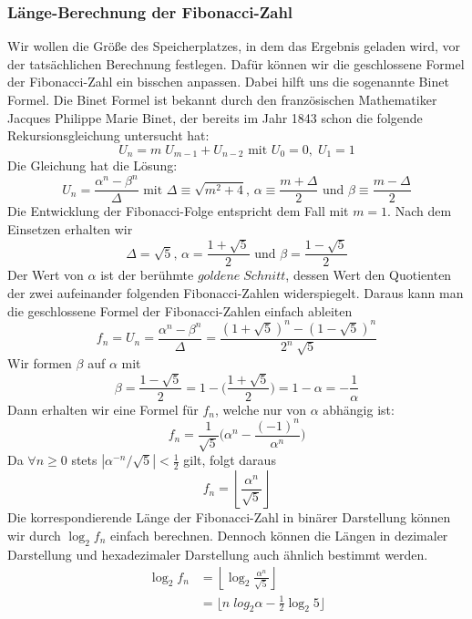 \documentclass[course=erap]{aspdoc}
\begin{document}
\subsubsection{Länge-Berechnung der Fibonacci-Zahl}
Wir wollen die Größe des Speicherplatzes, in dem das Ergebnis geladen wird, vor der tatsächlichen Berechnung festlegen. Dafür können wir die geschlossene Formel der Fibonacci-Zahl ein bisschen anpassen. Dabei hilft uns die sogenannte Binet Formel. Die Binet Formel ist bekannt durch den französischen Mathematiker Jacques Philippe Marie Binet\cite{binet}, der bereits im Jahr 1843 schon die folgende Rekursionsgleichung untersucht hat:
\begin{equation*}
    U_n = m \; U_{m-1}+U_{n-2} 
    \text{ mit } 
    U_0=0, \; U_1=1
\end{equation*}
Die Gleichung hat die Lösung:
\begin{equation*}
    U_n = \frac{\alpha^n - \beta^n}{\Delta}
    \text{ mit }
    \Delta \equiv \sqrt{m^2+4}
    \text{, }
    \alpha \equiv \frac{m + \Delta}{2}
    \text{ und }
    \beta \equiv \frac{m - \Delta}{2}
\end{equation*}
Die Entwicklung der Fibonacci-Folge entspricht dem Fall mit $m = 1$. Nach dem Einsetzen erhalten wir
\begin{equation*}
    \Delta = \sqrt{5}
    \text{, }
    \alpha = \frac{1 + \sqrt{5}}{2}
    \text{ und }
    \beta = \frac{1 - \sqrt{5}}{2}
\end{equation*}
Der Wert von $\alpha$ ist der berühmte $goldene \; Schnitt$, dessen Wert den Quotienten der zwei aufeinander folgenden Fibonacci-Zahlen widerspiegelt. Daraus kann man die geschlossene Formel der Fibonacci-Zahlen einfach ableiten\cite{binetFormelFibonacci}
\[f_n = U_n = \frac{\alpha^n - \beta^n}{\Delta} = \frac{(1 + \sqrt{5})^n - (1 - \sqrt{5})^n}{2^n \; \sqrt{5}}\]
Wir formen $\beta$ auf $\alpha$ mit 
\[\beta = \frac{1-\sqrt{5}}{2} = 1 - \biggl( \frac{1 + \sqrt{5}}{2} \biggr) = 1 - \alpha = -\frac{1}{\alpha}\]
Dann erhalten wir eine Formel für $f_n$, welche nur von $\alpha$ abhängig ist:
\[f_n = \frac{1}{\sqrt{5} }\biggl( \alpha^n - \frac{(-1)^n}{\alpha^n} \biggr)\]
Da $\forall n\geq0$ stets $|\alpha^{-n}/\sqrt{5}|<\frac{1}{2}$ gilt, folgt daraus\cite{fibonacciMatrix}
\[f_n = \left \lfloor \frac{\alpha^n}{\sqrt{5}} \right \rfloor\]
Die korrespondierende Länge der Fibonacci-Zahl in binärer Darstellung können wir durch $\log_2 f_n$ einfach berechnen. Dennoch können die Längen in dezimaler Darstellung und hexadezimaler Darstellung auch ähnlich bestimmt werden.
\begin{align*}
    \log_2 f_n &= \left \lfloor \log_2 \frac{\alpha^n}{\sqrt{5}} \right \rfloor \\
                &= \lfloor n \; log_2 \alpha - \frac{1}{2} \log_2 5 \rfloor
\end{align*}
\end{document}
